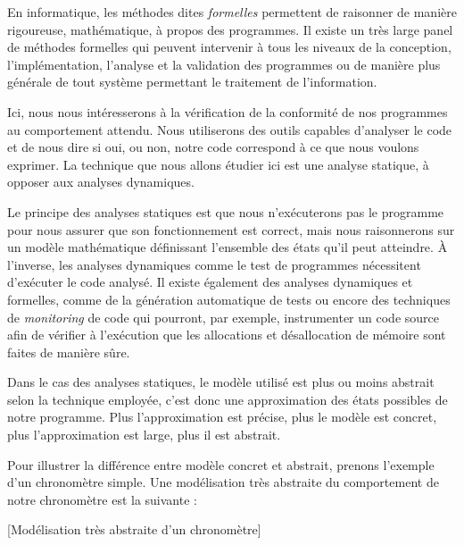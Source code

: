 
En informatique, les méthodes dites \textit{formelles} permettent
 de raisonner de manière rigoureuse, mathématique, à propos des
programmes. Il existe un très large panel de méthodes formelles qui peuvent
intervenir à tous les niveaux de la conception, l'implémentation, l'analyse et
la validation des programmes ou de manière plus générale de tout système
permettant le traitement de l'information.



Ici, nous nous intéresserons à la vérification de la conformité de nos
programmes au comportement attendu. Nous utiliserons
des outils capables d'analyser le code et de nous dire si oui, ou non, notre
code correspond à ce que nous voulons exprimer. La technique que nous allons
étudier ici est une analyse statique, à opposer aux analyses dynamiques.



Le principe des analyses statiques est que nous n'exécuterons pas le programme
pour nous assurer que son fonctionnement est correct, mais nous raisonnerons sur
un modèle mathématique définissant l'ensemble des états qu'il peut atteindre.
À l'inverse, les analyses dynamiques comme le test de programmes nécessitent
d'exécuter le code analysé. Il existe également des analyses dynamiques et
formelles, comme de la génération automatique de tests ou encore des techniques
de \textit{monitoring} de code qui pourront, par exemple, instrumenter un code
source afin de vérifier à l'exécution que les allocations et désallocation de
mémoire sont faites de manière sûre.



Dans le cas des analyses statiques, le modèle utilisé est plus ou moins
abstrait selon la technique employée, c'est donc une approximation des états
possibles de notre programme. Plus l'approximation est précise, plus le modèle est
concret, plus l'approximation est large, plus il est abstrait.



Pour illustrer la différence entre modèle concret et abstrait, prenons
l'exemple d'un chronomètre simple. Une modélisation très abstraite du
comportement de notre chronomètre est la suivante :


[Modélisation très abstraite d'un chronomètre]


